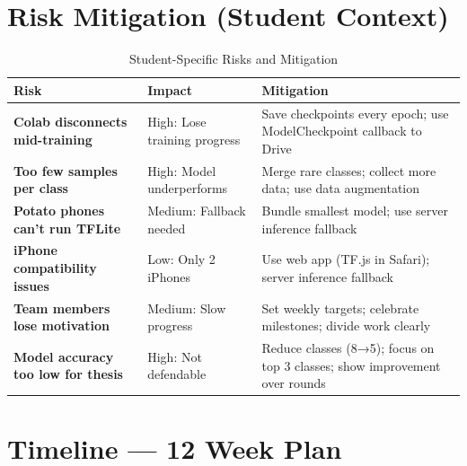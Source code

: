 \documentclass[11pt,a4paper]{article}
\begin{document}
\section{Risk Mitigation (Student Context)}

\begin{table}[h]
\centering
\caption{Student-Specific Risks and Mitigation}
\begin{tabular}{@{}p{3.5cm}p{5cm}p{4.5cm}@{}}
\toprule
\textbf{Risk} & \textbf{Impact} & \textbf{Mitigation} \\
\midrule
\textbf{Colab disconnects mid-training} & High: Lose training progress & Save checkpoints every epoch; use ModelCheckpoint callback to Drive \\
\textbf{Too few samples per class} & High: Model underperforms & Merge rare classes; collect more data; use data augmentation \\
\textbf{Potato phones can't run TFLite} & Medium: Fallback needed & Bundle smallest model; use server inference fallback \\
\textbf{iPhone compatibility issues} & Low: Only 2 iPhones & Use web app (TF.js in Safari); server inference fallback \\
\textbf{Team members lose motivation} & Medium: Slow progress & Set weekly targets; celebrate milestones; divide work clearly \\
\textbf{Model accuracy too low for thesis} & High: Not defendable & Reduce classes (8→5); focus on top 3 classes; show improvement over rounds \\
\bottomrule
\end{tabular}
\end{table}

\section{Timeline — 12 Week Plan}
\end{document}
